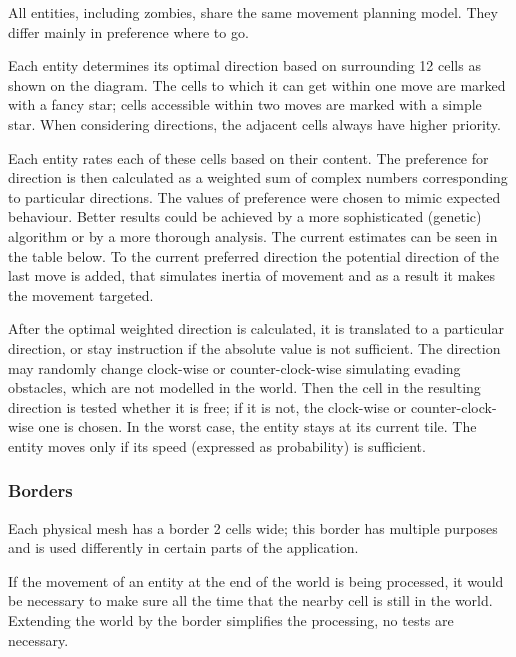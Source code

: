 \documentclass[a4paper]{article}
\begin{document}
All entities, including zombies, share the same movement planning model.
They differ mainly in preference where to go.

Each entity determines its optimal direction based on surrounding 12 cells as shown on the diagram.
The cells to which it can get within one move are marked with a fancy star; cells accessible within two moves are marked with a simple star.
When considering directions, the adjacent cells always have higher priority.

Each entity rates each of these cells based on their content.
The preference for direction is then calculated as a weighted sum of complex numbers corresponding to particular directions.
The values of preference were chosen to mimic expected behaviour.
Better results could be achieved by a more sophisticated (genetic) algorithm or by a more thorough analysis.
The current estimates can be seen in the table below.
To the current preferred direction the potential direction of the last move is added, that simulates inertia of movement and as a result it makes the movement targeted.


After the optimal weighted direction is calculated, it is translated to a particular direction, or stay instruction if the absolute value is not sufficient.
The direction may randomly change clock-wise or counter-clock-wise simulating evading obstacles, which are not modelled in the world.
Then the cell in the resulting direction is tested whether it is free; if it is not, the clock-wise or counter-clock-wise one is chosen.
In the worst case, the entity stays at its current tile.
The entity moves only if its speed (expressed as probability) is sufficient.

\subsubsection{Borders}

Each physical mesh has a border 2 cells wide; this border has multiple purposes and is used differently in certain parts of the application.

If the movement of an entity at the end of the world is being processed, it would be necessary to make sure all the time that the nearby cell is still in the world.
Extending the world by the border simplifies the processing, no tests are necessary.
\end{document}
